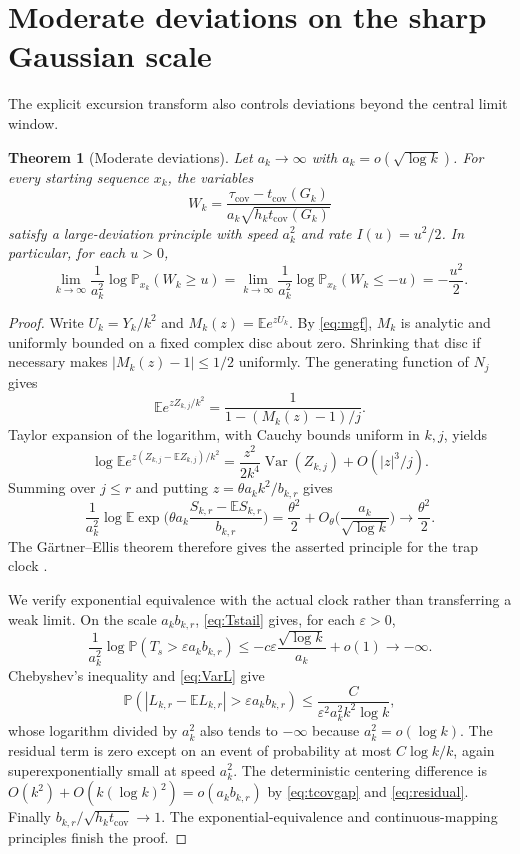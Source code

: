 \documentclass[11pt]{amsart}
\newtheorem{theorem}{Theorem}[section]
\theoremstyle{remark}
\numberwithin{equation}{section}
\DeclareMathOperator{\Var}{Var}
\newcommand{\E}{\mathbb{E}}
\newcommand{\Prob}{\mathbb{P}}
\newcommand{\tcov}{t_{\mathrm{cov}}}
\newcommand{\taucov}{\tau_{\mathrm{cov}}}
\begin{document}
\section{Moderate deviations on the sharp Gaussian scale}\label{sec:moderate}

The explicit excursion transform also controls deviations beyond the central limit window.

\begin{theorem}[Moderate deviations]\label{thm:moderate}
Let $a_k\to\infty$ with $a_k=o(\sqrt{\log k})$. For every starting sequence $x_k$, the variables
\[
W_k=\frac{\taucov-\tcov(G_k)}{a_k\sqrt{h_k\tcov(G_k)}}
\]
satisfy a large-deviation principle with speed $a_k^2$ and rate $I(u)=u^2/2$. In particular, for each $u>0$,
\[
\lim_{k\to\infty}\frac1{a_k^2}\log\Prob_{x_k}(W_k\ge u)=\lim_{k\to\infty}\frac1{a_k^2}\log\Prob_{x_k}(W_k\le -u)=-\frac{u^2}{2}.
\]
\end{theorem}

\begin{proof}
Write $U_k=Y_k/k^2$ and $M_k(z)=\E e^{zU_k}$. By \eqref{eq:mgf}, $M_k$ is analytic and uniformly bounded on a fixed complex disc about zero. Shrinking that disc if necessary makes $|M_k(z)-1|\le 1/2$ uniformly. The generating function of $N_j$ gives
\[
\E e^{zZ_{k,j}/k^2}=\frac1{1-(M_k(z)-1)/j}.
\]
Taylor expansion of the logarithm, with Cauchy bounds uniform in $k,j$, yields
\begin{equation}\label{eq:cumulant}
\log\E e^{z(Z_{k,j}-\E Z_{k,j})/k^2}=\frac{z^2}{2k^4}\Var(Z_{k,j})+O(|z|^3/j).
\end{equation}
Summing over $j\le r$ and putting $z=\theta a_kk^2/b_{k,r}$ gives
\[
\frac1{a_k^2}\log\E\exp\Big(\theta a_k\frac{S_{k,r}-\E S_{k,r}}{b_{k,r}}\Big)=\frac{\theta^2}{2}+O_\theta\Big(\frac{a_k}{\sqrt{\log k}}\Big)\longrightarrow\frac{\theta^2}{2}.
\]
The G\"artner--Ellis theorem therefore gives the asserted principle for the trap clock \cite[Section 2.3]{DemboZeitouni}.

We verify exponential equivalence with the actual clock rather than transferring a weak limit. On the scale $a_kb_{k,r}$, \eqref{eq:Tstail} gives, for each $\varepsilon>0$,
\[
\frac1{a_k^2}\log\Prob(T_s>\varepsilon a_kb_{k,r})\le-c\varepsilon\frac{\sqrt{\log k}}{a_k}+o(1)\longrightarrow-\infty.
\]
Chebyshev's inequality and \eqref{eq:VarL} give
\[
\Prob(|L_{k,r}-\E L_{k,r}|>\varepsilon a_kb_{k,r})\le\frac{C}{\varepsilon^2a_k^2k^2\log k},
\]
whose logarithm divided by $a_k^2$ also tends to $-\infty$ because $a_k^2=o(\log k)$. The residual term is zero except on an event of probability at most $C\log k/k$, again superexponentially small at speed $a_k^2$. The deterministic centering difference is $O(k^2)+O(k(\log k)^2)=o(a_kb_{k,r})$ by \eqref{eq:tcovgap} and \eqref{eq:residual}. Finally $b_{k,r}/\sqrt{h_k\tcov}\to 1$. The exponential-equivalence and continuous-mapping principles \cite[Section 4.2]{DemboZeitouni} finish the proof.
\end{proof}
\end{document}
